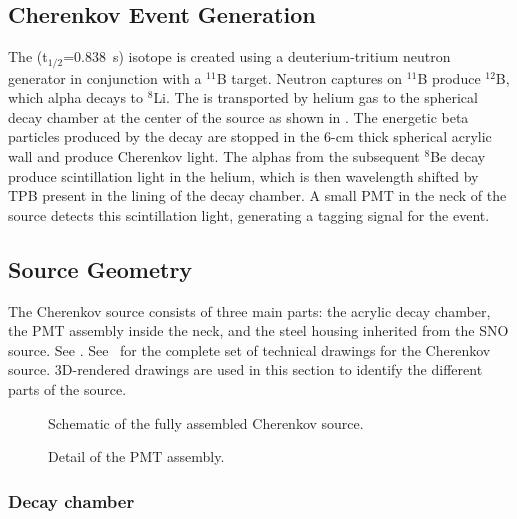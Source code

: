 \subsection{Cherenkov Event Generation}

The \Li (t$_{1/2}$=0.838~s) isotope is created using a deuterium-tritium neutron generator in conjunction with a $^{11}$B target.
Neutron captures on $^{11}$B produce $^{12}$B, which alpha decays to $^{8}$Li.
The \Li is transported by helium gas to the spherical decay chamber at the center of the source as shown in . 
The energetic beta particles produced by the decay are stopped in the 6-cm thick spherical acrylic wall and produce Cherenkov light. 
The alphas from the subsequent $^{8}$Be decay produce scintillation light in the helium, which is then wavelength shifted by TPB present in the lining of the decay chamber.
A small PMT in the neck of the source detects this scintillation light, generating a tagging signal for the event. 

\subsection{Source Geometry}
The Cherenkov source consists of three main parts: the acrylic decay chamber, the PMT assembly inside the neck, and the steel housing inherited from the SNO \Li source. See .
See~\cite{wallig:2015} for the complete set of technical drawings for the Cherenkov source. 3D-rendered drawings are used in this section to identify the different parts of the source.

\begin{figure}
\caption{\label{fig:design-1}Schematic of the fully assembled Cherenkov source.}
\end{figure}

\begin{figure}
\caption{\label{fig:design-2}Detail of the PMT assembly.}
\end{figure}

\subsubsection{Decay chamber}


